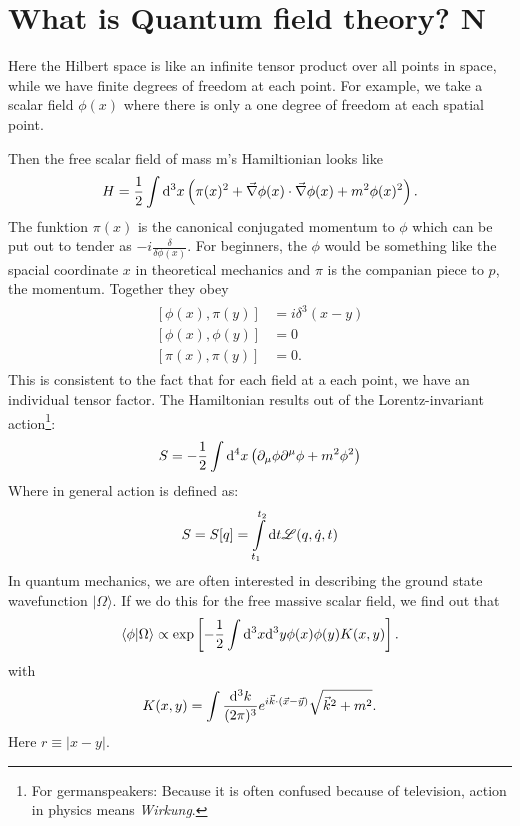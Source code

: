 \section{What is Quantum field theory? \textbf{N}}
	Here the Hilbert space is like an infinite tensor product over all points in space, while we have finite degrees of freedom at each point. 
For example, we take a scalar field $\phi(x)$ where there is only a one degree of freedom at each spatial point. 

	Then the free scalar field of mass m's Hamiltionian looks like
		\begin{equation}
			H=\frac{1}{2}\int \mathrm{d}^3 x \left(\pi(x)^2 + \vec{\nabla}\phi(x) \cdot \vec{\nabla}\phi(x) + m^2\phi(x)^2 \right).
		\end{equation}
	The funktion $\pi(x)$ is the canonical conjugated momentum to $\phi$ which can be put out to tender as $-i\frac{\delta}{\delta\phi(x)}$. For beginners, the $\phi$ would be something like the spacial coordinate $x$ in theoretical mechanics and $\pi$ is the companian piece to $p$, the momentum.
	Together they obey
		\begin{align}
			\begin{split}
				[\phi(x),\pi(y)]&=i \delta^3(x-y) \\
				[\phi(x),\phi(y)]&=0 \\
				[\pi(x),\pi(y)]&=0.
			\end{split}
		\end{align}
	This is consistent to the fact that for each field at a each point, we have an individual tensor factor.		
	The Hamiltonian results out of the Lorentz-invariant action\footnote{For germanspeakers: Because it is often confused because of television, action in physics means \textit{Wirkung}.}:
		\begin{equation}
			S=-\frac{1}{2} \int \mathrm{d}^4 x \left(\partial_\mu \phi \partial^\mu \phi + m^2\phi^2 \right)
		\end{equation}
	Where in general action is defined as: 
		\begin{equation} 
			S=S[q]= \int\limits_{t_1}^{t_2} \mathrm{d} t \mathscr{L}(q,\dot q,t)
		\end{equation} 
	In quantum mechanics, we are often interested in describing the ground state wavefunction $|\Omega\rangle$. If we do this for the free massive scalar field, we find out that \marginpar{[7]}
		\begin{equation}
			\langle\phi| \Omega\rangle \propto \exp\left[-\frac{1}{2} \int \mathrm{d}^3 x \mathrm{d}^3 y \phi(x)\phi(y) K(x,y)\right].
		\end{equation}
	with
		\begin{equation}
			K(x,y)=\int \frac{\mathrm{d}^3 k}{(2\pi)^3} e^{i\vec{k} \cdot (\vec{x}-\vec{y})} \sqrt{\vec{k}^2+m^2}.
		\end{equation}
	Here $r \equiv |x-y|$.
	

